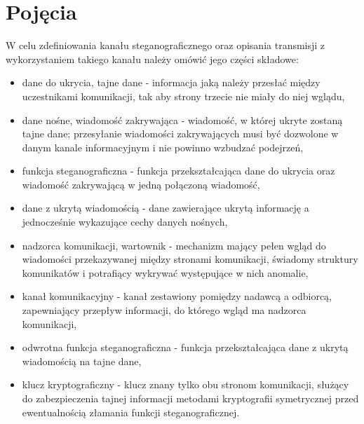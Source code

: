 \documentclass[a4paper,12pt,twoside,openany]{report}
\begin{document}
\section{Pojęcia}
W celu zdefiniowania kanału steganograficznego oraz opisania transmisji z 
wykorzystaniem takiego kanału należy omówić jego części składowe:
\begin{itemize}
	\item dane do ukrycia, tajne dane - informacja jaką należy przesłać 
między uczestnikami komunikacji, tak aby strony trzecie nie miały do niej 
wglądu,
	\item dane nośne, wiadomość zakrywająca - wiadomość, w której ukryte 
zostaną tajne dane; przesyłanie wiadomości zakrywających musi być dozwolone w 
danym kanale informacyjnym i nie powinno wzbudzać podejrzeń,
	\item funkcja steganograficzna - funkcja przekształcająca dane do 
ukrycia oraz wiadomość zakrywającą w jedną połączoną wiadomość,
	\item dane z ukrytą wiadomością - dane zawierające ukrytą informację a 
jednocześnie wykazujące cechy danych nośnych,
	\item nadzorca komunikacji, wartownik - mechanizm mający pełen wgląd do 
wiadomości przekazywanej między stronami komunikacji, świadomy struktury 
komunikatów i potrafiący wykrywać występujące w nich anomalie,
	\item kanał komunikacyjny - kanał zestawiony pomiędzy nadawcą a 
odbiorcą, zapewniający przepływ informacji, do którego wgląd ma nadzorca 
komunikacji,
	\item odwrotna funkcja steganograficzna - funkcja przekształcająca dane 
z ukrytą wiadomością na tajne dane,
	\item klucz kryptograficzny - klucz znany tylko obu stronom komunikacji, 
służący do zabezpieczenia tajnej informacji metodami kryptografii symetrycznej 
przed ewentualnością złamania funkcji steganograficznej.
\end{itemize}
\end{document}
